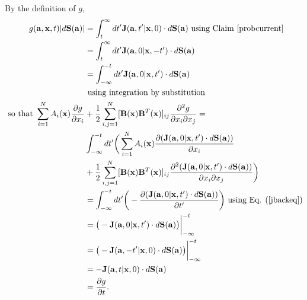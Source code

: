 \documentclass{article}
\newcommand{\mb}{\mathbf}
\begin{document}
\begin{pf}
By the definition of $g$,
{
\begin{align*}
g({\mb a},{\mb x},t)|d{\mb S}({\mb a})|
&=\int_t^\infty dt' {\mb J}({\mb a},t'|{\mb x},0)\cdot d{\mb S}(\mb{a}) \text{ using Claim \ref{probcurrent}}
\\&=\int_t^\infty dt' {\mb J}({\mb a},0|{\mb x},-t')\cdot d{\mb S}(\mb{a})
\\&=\int_{-\infty}^{-t}dt' {\mb J}({\mb a},0|{\mb x},t')\cdot d{\mb S}(\mb{a})\\& \text{ using integration by substitution}
\\ \text{ so that }  \sum_{i=1}^NA_i({\mb x})\frac{\partial g}{\partial x_i}&+\frac{1}{2}\sum_{i,j=1}^N[{\mb B}({\mb x}){\mb B}^T({\mb x})]_{ij}\frac{\partial ^2 g}{\partial x_i\partial x_j}=
\\&\int_{-\infty}^{-t} dt'\bigg(\sum_{i=1}^NA_i({\mb x})\frac{\partial ({\mb J}({\mb a},0|{\mb x},t')\cdot d{\mb S}({\mb a}))}{\partial x_i}\\&+\frac{1}{2}\sum_{i,j=1}^N[{\mb B}({\mb x}){\mb B}^T({\mb x})]_{ij}\frac{\partial ^2 ({\mb J}({\mb a},0|{\mb x},t')\cdot d{\mb S}({\mb a}))}{\partial x_i\partial x_j}\bigg)
\\&=\int_{-\infty}^{-t}dt' \bigg(-\frac{\partial ({\mb J}({\mb a},0|{\mb x},t')\cdot d{\mb S}({\mb a}))}{\partial t'}\bigg) \text{ using Eq.  (\ref{jbackeq})}
\\&=\big(-{\mb J}({\mb a},0|{\mb x},t')\cdot d{\mb S}({\mb a})\big)\bigg|_{-\infty}^{-t}
\\&=\big(-{\mb J}({\mb a},-t'|{\mb x},0)\cdot d{\mb S}({\mb a})\big)\bigg|_{-\infty}^{-t}
\\&=-{\mb J}({\mb a},t|{\mb x},0)\cdot d{\mb S}({\mb a})\
\\&=\frac{\partial g}{\partial t}.
\end{align*}
}
\end{pf}
\end{document}
